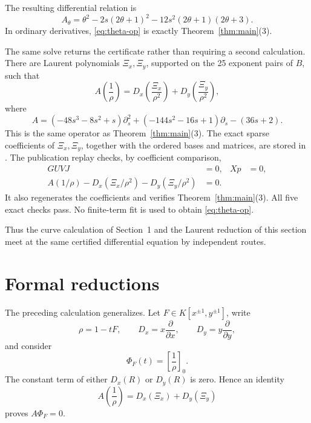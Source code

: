 \documentclass[11pt,fleqn]{article}
\theoremstyle{plain}
\newcommand{\Dx}{D_x}
\newcommand{\Dy}{D_y}
\begin{document}
The resulting differential relation is
\begin{equation}\label{eq:theta-op}
  A_\theta=
 \theta^2-2s(2\theta+1)^2
 -12s^2(2\theta+1)(2\theta+3).
\end{equation}
In ordinary derivatives, \eqref{eq:theta-op} is exactly
Theorem~\ref{thm:main}(3).

The same solve returns the certificate rather than requiring a second
calculation.  There are Laurent polynomials \(\Xi_x,\Xi_y\), supported on the
25 exponent pairs of \(B\), such that
\begin{equation}\label{eq:Xi-identity}
 A\!\left(\frac1\rho\right)
 =\Dx\!\left(\frac{\Xi_x}{\rho^2}\right)
 +\Dy\!\left(\frac{\Xi_y}{\rho^2}\right),
\end{equation}
where
\[
 A=(-48s^3-8s^2+s)\partial_s^2
   +(-144s^2-16s+1)\partial_s-(36s+2).
\]
This is the same operator as Theorem~\ref{thm:main}(3).  The exact sparse
coefficients of \(\Xi_x,\Xi_y\), together with the ordered bases and matrices,
are stored in
.
The publication replay checks, by coefficient comparison,
\[
 \begin{aligned}
 GUVJ&=0, & Xp&=0,\\
 A(1/\rho)-\Dx(\Xi_x/\rho^2)-\Dy(\Xi_y/\rho^2)&=0.
 \end{aligned}
\]
It also regenerates the coefficients and verifies Theorem~\ref{thm:main}(3).
All five exact checks pass.  No finite-term fit is used to obtain
\eqref{eq:theta-op}.

Thus the curve calculation of Section~1 and the Laurent reduction of this
section meet at the same certified differential equation by independent
routes.

\section{Formal reductions}

The preceding calculation generalizes.  Let
\(F\in K[x^{\pm1},y^{\pm1}]\), write
\[
 \rho=1-tF,
 \qquad
 \Dx=x\frac{\partial}{\partial x},
 \qquad
 \Dy=y\frac{\partial}{\partial y},
\]
and consider
\[
 \Phi_F(t)=\left[\frac1\rho\right]_0.
\]
The constant term of either \(\Dx(R)\) or \(\Dy(R)\) is zero.  Hence an
identity
\begin{equation}\label{eq:general-cert}
 A\!\left(\frac1\rho\right)=\Dx(\Xi_x)+\Dy(\Xi_y)
\end{equation}
proves \(A\Phi_F=0\).
\end{document}

